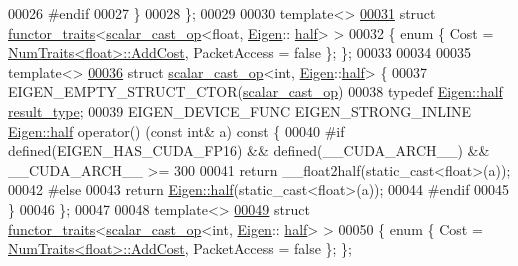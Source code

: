 \begin{DoxyCode}
00026 \textcolor{preprocessor}{    #endif}
00027   \}
00028 \};
00029 
00030 \textcolor{keyword}{template}<>
\hyperlink{struct_eigen_1_1internal_1_1functor__traits_3_01scalar__cast__op_3_01float_00_01_eigen_1_1half_01_4_01_4}{00031} \textcolor{keyword}{struct }\hyperlink{struct_eigen_1_1internal_1_1functor__traits}{functor\_traits}<\hyperlink{struct_eigen_1_1internal_1_1scalar__cast__op}{scalar\_cast\_op}<float, \hyperlink{namespace_eigen}{Eigen}::
      \hyperlink{struct_eigen_1_1half}{half}> >
00032 \{ \textcolor{keyword}{enum} \{ Cost = \hyperlink{group___core___module_struct_eigen_1_1_num_traits}{NumTraits<float>::AddCost}, PacketAccess = \textcolor{keyword}{false} \}; \};
00033 
00034 
00035 \textcolor{keyword}{template}<>
\hyperlink{struct_eigen_1_1internal_1_1scalar__cast__op_3_01int_00_01_eigen_1_1half_01_4}{00036} \textcolor{keyword}{struct }\hyperlink{struct_eigen_1_1internal_1_1scalar__cast__op}{scalar\_cast\_op}<int, \hyperlink{namespace_eigen}{Eigen}::\hyperlink{struct_eigen_1_1half}{half}> \{
00037   EIGEN\_EMPTY\_STRUCT\_CTOR(\hyperlink{struct_eigen_1_1internal_1_1scalar__cast__op}{scalar\_cast\_op})
00038   \textcolor{keyword}{typedef} \hyperlink{struct_eigen_1_1half}{Eigen::half} \hyperlink{struct_eigen_1_1half}{result\_type};
00039   EIGEN\_DEVICE\_FUNC EIGEN\_STRONG\_INLINE \hyperlink{struct_eigen_1_1half}{Eigen::half} operator() (\textcolor{keyword}{const} \textcolor{keywordtype}{int}& a)\textcolor{keyword}{ const }\{
00040 \textcolor{preprocessor}{    #if defined(EIGEN\_HAS\_CUDA\_FP16) && defined(\_\_CUDA\_ARCH\_\_) && \_\_CUDA\_ARCH\_\_ >= 300}
00041       \textcolor{keywordflow}{return} \_\_float2half(static\_cast<float>(a));
00042 \textcolor{preprocessor}{    #else}
00043       \textcolor{keywordflow}{return} \hyperlink{struct_eigen_1_1half}{Eigen::half}(static\_cast<float>(a));
00044 \textcolor{preprocessor}{    #endif}
00045   \}
00046 \};
00047 
00048 \textcolor{keyword}{template}<>
\hyperlink{struct_eigen_1_1internal_1_1functor__traits_3_01scalar__cast__op_3_01int_00_01_eigen_1_1half_01_4_01_4}{00049} \textcolor{keyword}{struct }\hyperlink{struct_eigen_1_1internal_1_1functor__traits}{functor\_traits}<\hyperlink{struct_eigen_1_1internal_1_1scalar__cast__op}{scalar\_cast\_op}<int, \hyperlink{namespace_eigen}{Eigen}::
      \hyperlink{struct_eigen_1_1half}{half}> >
00050 \{ \textcolor{keyword}{enum} \{ Cost = \hyperlink{group___core___module_struct_eigen_1_1_num_traits}{NumTraits<float>::AddCost}, PacketAccess = \textcolor{keyword}{false} \}; \};

\end{DoxyCode}

